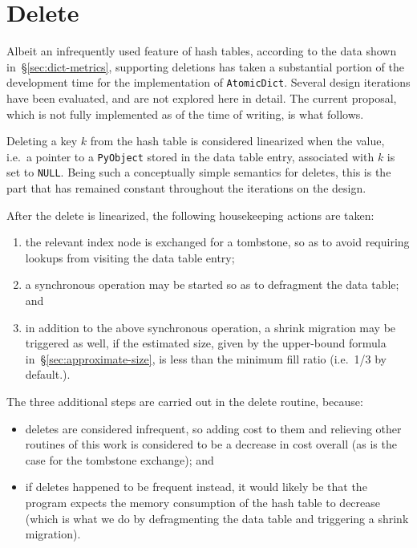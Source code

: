 \section{Delete}\label{sec:delete}

Albeit an infrequently used feature of hash tables, according to the data shown in~\S\ref{sec:dict-metrics}, supporting deletions has taken a substantial portion of the development time for the implementation of \texttt{AtomicDict}.
Several design iterations have been evaluated, and are not explored here in detail.
The current proposal, which is not fully implemented as of the time of writing, is what follows.

Deleting a key $k$ from the hash table is considered linearized when the value, i.e.\ a pointer to a \texttt{PyObject} stored in the data table entry, associated with $k$ is set to \texttt{NULL}.
Being such a conceptually simple semantics for deletes, this is the part that has remained constant throughout the iterations on the design.

After the delete is linearized, the following housekeeping actions are taken:
\begin{enumerate}
	\item the relevant index node is exchanged for a tombstone, so as to avoid requiring lookups from visiting the data table entry;
	\item a synchronous operation may be started so as to defragment the data table; and
	\item in addition to the above synchronous operation, a shrink migration may be triggered as well, if the estimated size, given by the upper-bound formula in~\S\ref{sec:approximate-size}, is less than the minimum fill ratio (i.e.\ 1/3 by default.).
\end{enumerate}

The three additional steps are carried out in the delete routine, because:
\begin{itemize}
	\item deletes are considered infrequent, so adding cost to them and relieving other routines of this work is considered to be a decrease in cost overall (as is the case for the tombstone exchange); and
	\item if deletes happened to be frequent instead, it would likely be that the program expects the memory consumption of the hash table to decrease (which is what we do by defragmenting the data table and triggering a shrink migration).
\end{itemize}


